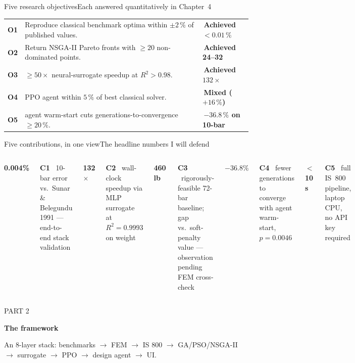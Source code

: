 \documentclass[aspectratio=169]{beamer}
\newcommand{\cardnum}[2]{%
  \begin{minipage}[t]{\linewidth}\raggedright
    {\fontsize{22}{24}\selectfont\bfseries\color{accent}#1}\par
    \vspace{0.35em}
    {\fontsize{9}{11}\selectfont\color{inkmuted}#2\par}
  \end{minipage}%
}
\newcommand{\sectioncover}[3]{%
  \begingroup
  \setbeamertemplate{footline}{}
  \setbeamertemplate{frametitle}{}
  \begin{frame}[plain]
    \vspace*{0.3cm}
    \begin{minipage}{\linewidth}
      \raggedright
      {\fontsize{10}{12}\selectfont\color{inkmuted}\MakeUppercase{Part #1}\par}
      \vspace{0.8em}
      {\fontsize{38}{44}\selectfont\bfseries\color{ink}#2\par}
      \vspace{0.6em}
      {\fontsize{14}{18}\selectfont\color{inkmuted}#3\par}
    \end{minipage}
  \end{frame}
  \endgroup
}
\newcommand{\pillgreen}[1]{\colorbox{accent2!15}{\textcolor{accent2!80!black}{\footnotesize\bfseries\,#1\,}}}
\newcommand{\pillred}[1]{\colorbox{hiwarn!15}{\textcolor{hiwarn}{\footnotesize\bfseries\,#1\,}}}
\begin{document}
\begin{frame}{Five research objectives}{Each answered quantitatively in Chapter~4}
  \setlength{\tabcolsep}{0.3em}\renewcommand{\arraystretch}{1.25}
  \begin{tabular}{@{}p{0.04\linewidth}p{0.72\linewidth}p{0.2\linewidth}@{}}
    \textbf{O1} & Reproduce classical benchmark optima within $\pm 2\,\%$ of published values. & \pillgreen{Achieved $<\!0.01\,\%$} \\
    \textbf{O2} & Return NSGA-II Pareto fronts with $\ge 20$ non-dominated points.           & \pillgreen{Achieved 24--32} \\
    \textbf{O3} & $\ge 50\times$ neural-surrogate speedup at $R^2 > 0.98$.                   & \pillgreen{Achieved $132\times$} \\
    \textbf{O4} & PPO agent within $5\,\%$ of best classical solver.                          & \pillred{Mixed ($+16\,\%$)} \\
    \textbf{O5} & agent warm-start cuts generations-to-convergence $\ge 20\,\%$.               & \pillgreen{$-36.8\,\%$ on 10-bar} \\
  \end{tabular}
\end{frame}

\begin{frame}{Five contributions, in one view}{The headline numbers I will defend}
  \vspace{0.4em}
  \begin{columns}[t,onlytextwidth]
     \cardnum{0.004\%}{\textbf{C1} \ 10-bar error vs.\ Sunar \& Belegundu 1991 --- end-to-end stack validation}
    \hfill
     \cardnum{132$\times$}{\textbf{C2} \ wall-clock speedup via MLP surrogate at $R^2=0.9993$ on weight}
    \hfill
     \cardnum{460\,lb}{\textbf{C3} \ rigorously-feasible 72-bar baseline; gap vs.\ soft-penalty value --- observation pending FEM cross-check}
    \hfill
     \cardnum{$-36.8\%$}{\textbf{C4} \ fewer generations to converge with agent warm-start, $p=0.0046$}
    \hfill
     \cardnum{$<$10\,s}{\textbf{C5} \ full IS~800 pipeline, laptop CPU, no API key required}
  \end{columns}
\end{frame}

\sectioncover{2}{The framework}{%
  An 8-layer stack: benchmarks $\rightarrow$ FEM $\rightarrow$ IS 800 $\rightarrow$ GA/PSO/NSGA-II\\
  $\rightarrow$ surrogate $\rightarrow$ PPO $\rightarrow$ design agent $\rightarrow$ UI.
}
\end{document}
